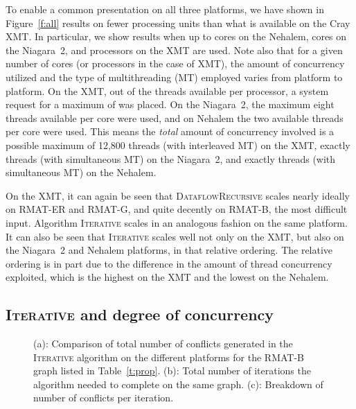 \documentclass{article}
\begin{document}
To enable a common presentation on all three platforms,  we have shown 
in Figure~\ref{f:all} results on fewer processing units than what is available
on the Cray XMT. In particular, we show results when up to  cores on the Nehalem, 
 cores on the Niagara~2, and  processors on the XMT are used.   
Note also that for a given number of cores (or processors in the case of XMT),
the amount of concurrency utilized and the type of 
multithreading (MT) employed varies from platform to platform. 
On the XMT, out of  the  threads 
available per processor,  a system request for a maximum of  was placed.
On the Niagara~2, the maximum eight threads available per core were used,
and on Nehalem the two available threads per core were used.   
This means the {\em total} amount of concurrency involved is a possible maximum of 
12,800 threads (with interleaved MT) on the XMT, 
exactly  threads (with simultaneous MT) on the Niagara~2, and 
exactly  threads  (with simultaneous MT) on the Nehalem.


On the XMT, it can again be seen that \textsc{DataflowRecursive} scales 
nearly ideally on RMAT-ER and RMAT-G, and quite decently on RMAT-B, the most difficult input. 
Algorithm \textsc{Iterative} scales in an analogous fashion on the same platform.
It can also be seen that \textsc{Iterative} scales well not only on the XMT, but
also on the Niagara~2 and Nehalem platforms, in that relative ordering.
The relative ordering is in part due  to the difference in the amount of thread concurrency
exploited, which is the highest on the XMT and the lowest on the Nehalem.

\subsection{\textsc{Iterative} and degree of concurrency}
\label{sec:iterative-more}

\begin{figure}
\centering
{}
\caption{\small 
(a): Comparison of total number of conflicts generated in the \textsc{Iterative} algorithm
on the different platforms for the RMAT-B graph listed in Table~\ref{t:prop}.
(b): Total number of iterations the algorithm needed to complete on the same graph.
(c): Breakdown of number of conflicts per iteration.}
\label{f:conflicts-iterations}
\end{figure}
\end{document}
